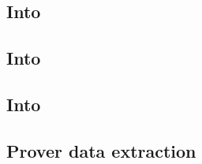\subsection{Into \wcpMod{}}         \label{block data: lookups: into wcp}                 
\subsection{Into \eucMod{}}         \label{block data: lookups: into euc}                 
\subsection{Into \txnDataMod{}}     \label{block data: lookups: into txn data}            
\subsection{Prover data extraction} \label{block data: lookups: prover data extraction}   
